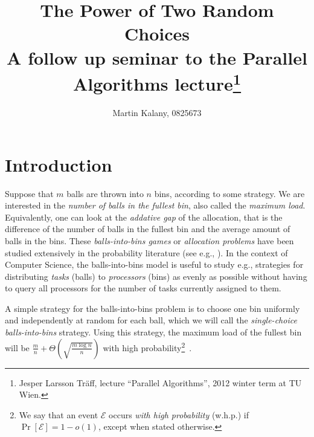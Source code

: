\documentclass[a4paper,12pt]{article}
\begin{document}
\title{The Power of Two Random Choices\\ 
\large A follow up seminar to the Parallel Algorithms lecture\footnote{Jesper Larsson Träff, lecture ``Parallel Algorithms'', 2012 winter term at TU Wien.}}
\author{Martin Kalany, 0825673}

\maketitle
\begin{abstract}

\end{abstract}


\section{Introduction}
\label{sec:intro}
Suppose that $m$ balls are thrown into $n$ bins, according to some strategy. We are interested in the \emph{number of balls in the fullest bin}, also called the \emph{maximum load}. Equivalently, one can look at the \emph{addative gap} of the allocation, that is the difference of the number of balls in the fullest bin and the average amount of balls in the bins. These \emph{balls-into-bins games} or \emph{allocation problems} have been studied extensively in the probability literature (see e.g., \cite{JK77}). In the context of Computer Science, the balls-into-bins model is useful to study e.g., strategies for distributing \emph{tasks} (balls) to \emph{processors} (bins) as evenly as possible without having to query all processors for the number of tasks currently assigned to them.

A simple strategy for the balls-into-bins problem is to choose one bin uniformly and independently at random for each ball, which we will call the \emph{single-choice balls-into-bins} strategy. Using this strategy, the maximum load of the fullest bin will be $\frac{m}{n} + \Theta\left(\sqrt{\frac{m \log n}{n}}\right)$ with high probability\footnote{We say that an event $\mathcal E$ occurs \emph{with high probability} (w.h.p.) if $\Pr\left[\mathcal E \right] = 1 - o(1)$, except when stated otherwise.}~\cite{RS98}.
\end{document}
